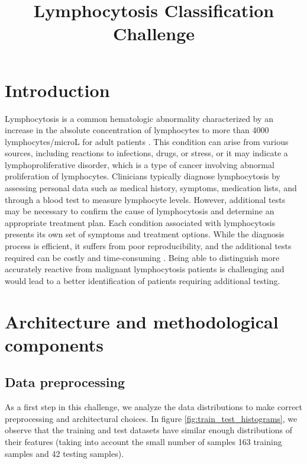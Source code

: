 \documentclass{midl}
\title[DLMI]{Lymphocytosis Classification Challenge}
\begin{document}
\maketitle

\begin{abstract}
\end{abstract}

\section{Introduction}
\label{sec:introduction}

Lymphocytosis is a common hematologic abnormality characterized by an increase in the absolute concentration of lymphocytes to more than 4000 lymphocytes/microL for adult patients \cite{Hamad_2023}. This condition can arise from various sources, including reactions to infections, drugs, or stress, or it may indicate a lymphoproliferative disorder, which is a type of cancer involving abnormal proliferation of lymphocytes. Clinicians typically diagnose lymphocytosis by assessing personal data such as medical history, symptoms, medication lists, and through a blood test to measure lymphocyte levels. However, additional tests may be necessary to confirm the cause of lymphocytosis and determine an appropriate treatment plan. Each condition associated with lymphocytosis presents its own set of symptoms and treatment options. While the diagnosis process is efficient, it suffers from poor reproducibility, and the additional tests required can be costly and time-consuming \cite{Sahasrabudhe_2021}. Being able to distinguish more accurately reactive from malignant lymphocytosis patients is challenging and would lead to a better identification of patients requiring additional testing.

\section{Architecture and methodological components}
\label{sec:methodology}

\subsection{Data preprocessing}

As a first step in this challenge, we analyze the data distributions to make correct preprocessing and architectural choices. In figure \ref{fig:train_test_histograms}, we observe that the training and test datasets have similar enough distributions of their features (taking into account the small number of samples 163 training samples and 42 testing samples).
\end{document}
